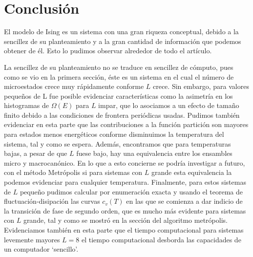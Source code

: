 \documentclass[%
 reprint,
 amsmath,amssymb,
 aps,
 pra,
]{revtex4-2}
\begin{document}
\section{Conclusión\label{sec:conclusion}}

El modelo de Ising es un sistema con una gran riqueza conceptual, debido a la sencillez de su planteamiento y a la gran cantidad de información que podemos obtener de él. Esto lo pudimos observar alrededor de todo el artículo. 

La sencillez de su planteamiento no se traduce en sencillez de cómputo, pues como se vio en la primera sección, éste es un sistema en el cual el número de microestados crece muy rápidamente conforme $L$ crece. Sin embargo, para valores pequeños de L fue posible evidenciar características como la asimetría en los histogramas de $\Omega(E)$ para $L$ impar, que lo asociamos a un efecto de tamaño finito debido a las condiciones de frontera periódicas usadas. Pudimos también evidenciar en esta parte que las contribuciones a la función partición son mayores para estados menos energéticos conforme disminuimos la temperatura del sistema, tal y como se espera. Además, encontramos que para temperaturas bajas, a pesar de que $L$ fuese bajo, hay una equivalencia entre los ensambles micro y macrocanónico. En lo que a esto concierne se podría investigar a futuro, con el método Metrópolis si para sistemas con $L$ grande esta equivalencia la podemos evidenciar para cualquier temperatura. Finalmente, para estos sistemas de $L$ pequeño pudimos calcular por enumeración exacta y usando el teorema de fluctuación-disipación las curvas $c_v(T)$ en las que se comienza a dar indicio de la transición de fase de segundo orden, que es mucho más evidente para sistemas con $L$ grande, tal y como se mostró en la sección del algoritmo metrópolis. Evidenciamos también en esta parte que el tiempo computacional para sistemas levemente mayores $L=8$ el tiempo computacional desborda las capacidades de un computador `sencillo'.
\end{document}
